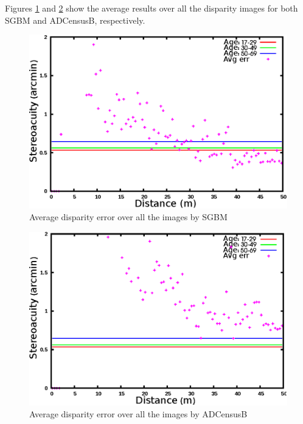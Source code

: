 \noindent
Figures \ref{fig:mskmapsgbm1000} and \ref{fig:mskmapadc1000} show the average results over all the disparity images for both SGBM and ADCensusB, respectively.

\begin{figure}[H]
\centering
\includegraphics[scale=0.95]{sgbmmsk1000}
\caption{Average disparity error over all the images by SGBM}
\label{fig:mskmapsgbm1000}
\end{figure} 
\begin{figure}[H]
\centering
\includegraphics[scale=0.95]{adcenmsk1000}
\caption{Average disparity error over all the images by ADCensusB}
\label{fig:mskmapadc1000}
\end{figure} 

